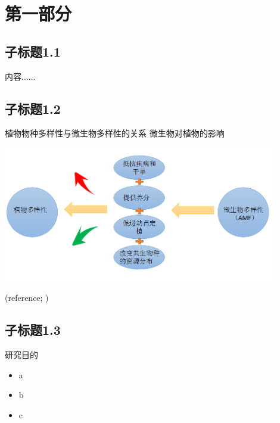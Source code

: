 \section{第一部分}

\subsection{子标题1.1}
\begin{frame}{\insertsubsection}
	内容......
\end{frame}

\subsection{子标题1.2}
\begin{frame}{\insertsubsection}
	植物物种多样性与微生物多样性的关系
	微生物对植物的影响
		\begin{center}
			\includegraphics[width = 0.9\textwidth]{./pic/1.2.3.png}
		\end{center}
		(reference; )
\end{frame}

\subsection{子标题1.3}
\begin{frame}{\insertsubsection}
	研究目的
	\begin{itemize}
		\item a
		\item b
		\item c
	\end{itemize}
\end{frame}